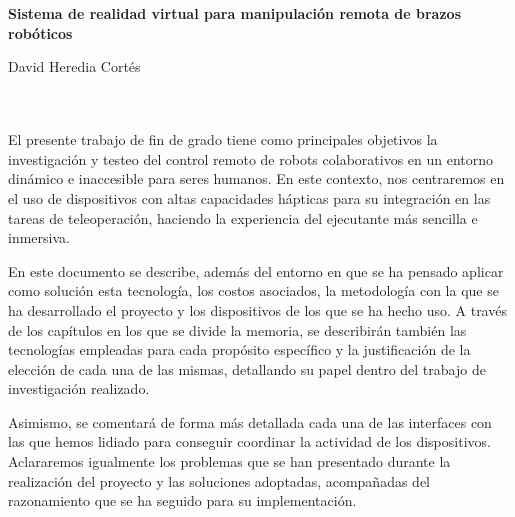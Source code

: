 \chapter*{}


%



\cleardoublepage
\thispagestyle{empty}

\begin{center}
{\large\bfseries Sistema de realidad virtual para manipulación remota de brazos robóticos}\\
\end{center}
\begin{center}
David Heredia Cortés\\
\end{center}

\\

\vspace{0.7cm}
\\

El presente trabajo de fin de grado tiene como principales  objetivos la investigación y testeo del control remoto de robots colaborativos en un entorno dinámico e inaccesible para seres humanos. En este contexto, nos centraremos en el uso de dispositivos con altas capacidades hápticas para su integración en las tareas de teleoperación, haciendo la experiencia del ejecutante más sencilla e inmersiva.

En este documento se describe, además del entorno en que se ha pensado aplicar como solución esta tecnología, los costos asociados, la metodología con la que se ha desarrollado el proyecto y los dispositivos de los que se ha hecho uso. A través de los capítulos en los que se divide la memoria, se describirán también las tecnologías empleadas para cada propósito específico y la justificación de la elección de cada una  de las mismas, detallando su papel dentro del trabajo de investigación realizado.

Asimismo, se comentará de forma más detallada cada una de las interfaces con las que hemos lidiado para conseguir coordinar la actividad de los dispositivos. Aclararemos igualmente los problemas que se han presentado durante la realización del proyecto y las soluciones adoptadas, acompañadas del razonamiento que se ha seguido para su implementación. 


